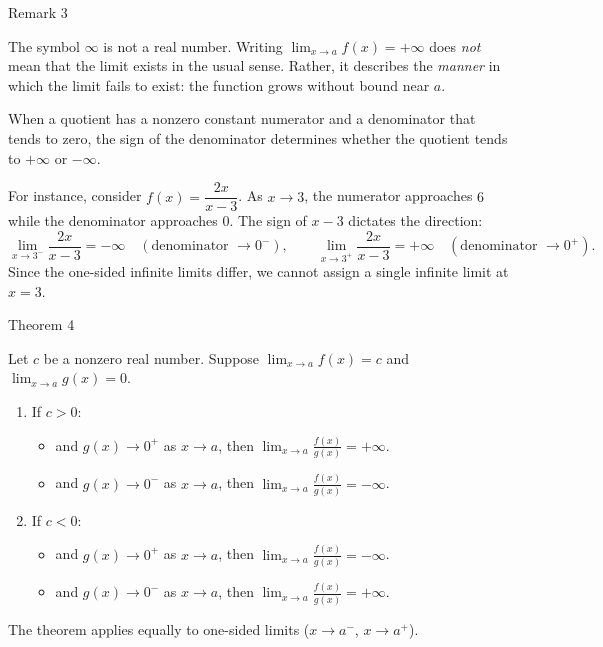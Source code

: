 \begin{remarkbox}{Remark 3}

The symbol \(\infty\) is not a real number. Writing \(\lim_{x \to a} f(x) = +\infty\) does \emph{not} mean that the limit exists in the usual sense. Rather, it describes the \emph{manner} in which the limit fails to exist: the function grows without bound near \(a\).
\end{remarkbox}

\bigskip

When a quotient has a nonzero constant numerator and a denominator that tends to zero, the sign of the denominator determines whether the quotient tends to \(+\infty\) or \(-\infty\).

\medskip
For instance, consider \(f(x) = \dfrac{2x}{x - 3}\). As \(x \to 3\), the numerator approaches \(6\) while the denominator approaches \(0\). The sign of \(x - 3\) dictates the direction:
\[
\lim_{x \to 3^{-}} \frac{2x}{x - 3} = -\infty
\quad (\text{denominator } \to 0^{-}),
\qquad
\lim_{x \to 3^{+}} \frac{2x}{x - 3} = +\infty
\quad (\text{denominator } \to 0^{+}).
\]
Since the one-sided infinite limits differ, we cannot assign a single infinite limit at \(x = 3\).


\begin{theorembox}{Theorem 4}

Let \(c\) be a nonzero real number. Suppose \(\displaystyle\lim_{x \to a} f(x) = c\) and \(\displaystyle\lim_{x \to a} g(x) = 0\).

\begin{enumerate}
    \item If \(c > 0\):
    \begin{itemize}
        \item and \(g(x) \to 0^{+}\) as \(x \to a\), then \(\displaystyle\lim_{x \to a} \frac{f(x)}{g(x)} = +\infty\).
        \item and \(g(x) \to 0^{-}\) as \(x \to a\), then \(\displaystyle\lim_{x \to a} \frac{f(x)}{g(x)} = -\infty\).
    \end{itemize}
    \item If \(c < 0\):
    \begin{itemize}
        \item and \(g(x) \to 0^{+}\) as \(x \to a\), then \(\displaystyle\lim_{x \to a} \frac{f(x)}{g(x)} = -\infty\).
        \item and \(g(x) \to 0^{-}\) as \(x \to a\), then \(\displaystyle\lim_{x \to a} \frac{f(x)}{g(x)} = +\infty\).
    \end{itemize}
\end{enumerate}
The theorem applies equally to one-sided limits (\(x \to a^{-}\), \(x \to a^{+}\)).
\end{theorembox}


